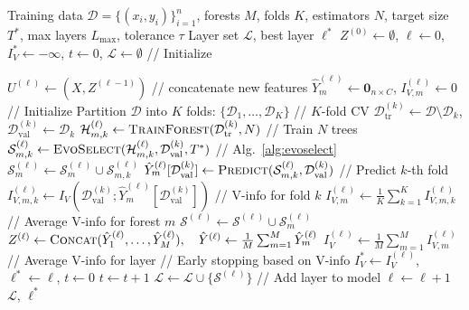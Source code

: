 \begin{algorithm}[t]
\caption{Deep Forest with V-Information Guided Evolutionary Ensemble Selection}
\label{alg:dfvinfo}
\begin{algorithmic}[1]
\Require Training data $\mathcal{D} = \{(x_i, y_i)\}_{i=1}^{n}$, forests $M$, folds $K$, estimators $N$, target size $T^*$, max layers $L_{\max}$, tolerance $\tau$
\Ensure Layer set $\mathcal{L}$, best layer $\ell^*$
\State $Z^{(0)} \leftarrow \emptyset$, $\ell \leftarrow 0$, $I_V^* \leftarrow -\infty$, $t \leftarrow 0$, $\mathcal{L} \leftarrow \emptyset$ \hfill {\color{gray}// Initialize}

 \hfill
    \State $U^{(\ell)} \leftarrow (X, Z^{(\ell-1)})$ \hfill {\color{gray}// concatenate new features}
     \hfill
        \State $\hat{Y}_m^{(\ell)} \leftarrow \mathbf{0}_{n \times C}$, $I_{V,m}^{(\ell)} \leftarrow 0$ \hfill {\color{gray}// Initialize}
        \State Partition $\mathcal{D}$ into $K$ folds: $\{\mathcal{D}_1, \ldots, \mathcal{D}_K\}$
         \hfill {\color{gray}// $K$-fold CV}
            \State $\mathcal{D}_{\text{tr}}^{(k)} \leftarrow \mathcal{D} \setminus \mathcal{D}_k$, \quad $\mathcal{D}_{\text{val}}^{(k)} \leftarrow \mathcal{D}_k$
            \State $\mathcal{H}_{m,k}^{(\ell)} \leftarrow \textsc{TrainForest}(\mathcal{D}_{\text{tr}}^{(k)}, N)$ \hfill {\color{gray}// Train $N$ trees}
            \State $\mathcal{S}_{m,k}^{(\ell)} \leftarrow \textsc{EvoSelect}(\mathcal{H}_{m,k}^{(\ell)}, \mathcal{D}_{\text{val}}^{(k)}, T^*)$ \hfill {\color{gray}// Alg.~\ref{alg:evoselect}}
            \State $\mathcal{S}_m^{(\ell)} \leftarrow \mathcal{S}_m^{(\ell)} \cup \mathcal{S}_{m,k}^{(\ell)}$ \hfill 
            \State $\hat{Y}_m^{(\ell)}[\mathcal{D}_{\text{val}}^{(k)}] \leftarrow \textsc{Predict}(\mathcal{S}_{m,k}^{(\ell)}, \mathcal{D}_{\text{val}}^{(k)})$ \hfill {\color{gray}// Predict $k$-th fold}
            \State $I_{V,m,k}^{(\ell)} \leftarrow I_V(\mathcal{D}_{\text{val}}^{(k)}; \hat{Y}_m^{(\ell)}[\mathcal{D}_{\text{val}}^{(k)}])$ \hfill {\color{gray}// V-info for fold $k$}
        \EndFor
        \State $I_{V,m}^{(\ell)} \leftarrow \frac{1}{K} \sum_{k=1}^{K} I_{V,m,k}^{(\ell)}$ \hfill {\color{gray}// Average V-info for forest $m$}
        \State $\mathcal{S}^{(\ell)} \leftarrow \mathcal{S}^{(\ell)} \cup \mathcal{S}_m^{(\ell)}$ \hfill 
    \EndFor
    \State $Z^{(\ell)} \leftarrow \textsc{Concat}(\hat{Y}_1^{(\ell)}, \ldots, \hat{Y}_M^{(\ell)}), \quad \hat{Y}^{(\ell)} \leftarrow \frac{1}{M} \sum_{m=1}^{M} \hat{Y}_m^{(\ell)}$ \hfill 
    \State $I_V^{(\ell)} \leftarrow \frac{1}{M} \sum_{m=1}^{M} I_{V,m}^{(\ell)}$ \hfill {\color{gray}// Average V-info for layer}
     \hfill {\color{gray}// Early stopping based on V-info}
        \State $I_V^* \leftarrow I_V^{(\ell)}$, $\ell^* \leftarrow \ell$, $t \leftarrow 0$ \hfill 
    \Else
        \State $t \leftarrow t + 1$ \hfill 
    \EndIf
    \State $\mathcal{L} \leftarrow \mathcal{L} \cup \{\mathcal{S}^{(\ell)}\}$ \hfill {\color{gray}// Add layer to model} 
    \State $\ell \leftarrow \ell + 1$
\EndWhile
\State \Return $\mathcal{L}$, $\ell^*$
\end{algorithmic}
\end{algorithm}

